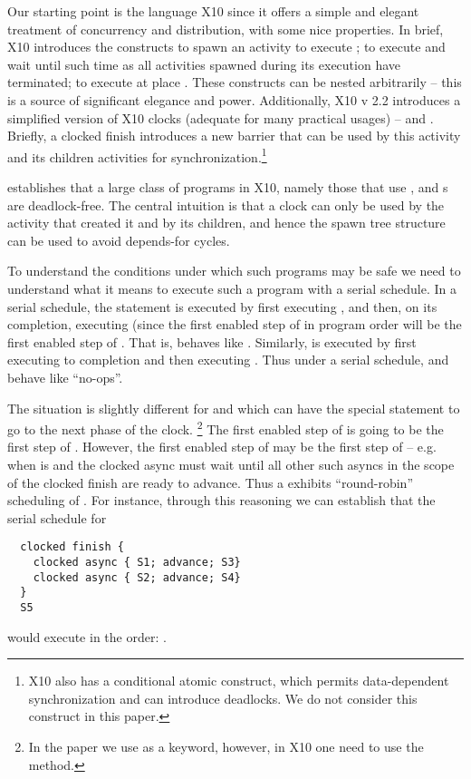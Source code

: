 Our starting point is the language X10 \cite{x10} since it offers a
simple and elegant treatment of concurrency and distribution, with
some nice properties.  In brief, X10
introduces the constructs  to spawn an activity to
execute ;  to execute  and wait until
such time as all activities spawned during its execution have
terminated;  to execute  at place
. These constructs can be nested arbitrarily -- this is a
source of significant elegance and power. Additionally, X10 v 2.2
introduces a simplified version of X10 clocks (adequate for many
practical usages) --  and . Briefly, a clocked finish introduces a new barrier that can be
used by this activity and its children activities for
synchronization.\footnote{X10 also has a conditional atomic construct,
   which permits data-dependent synchronization and
  can introduce deadlocks. We do not consider this construct in this paper.}

\cite{vj-clock} establishes that a large class of programs
in X10, namely those that use ,  and
s are deadlock-free. The central intuition is that a clock
can only be used by the activity that created it and by its children,
and hence the spawn tree structure can be used to avoid depends-for
cycles.

To understand the conditions under which such programs may be safe we
need to understand what it means to execute such a program with a
serial schedule. In a serial schedule, the statement  is executed by first executing , and then, on
its completion, executing  (since the first enabled step of
 in program order will be the first enabled step
of .  That is,  behaves like
. Similarly,  is executed by first
executing  to completion and then executing . Thus
under a serial schedule,  and  behave like
``no-ops''.

The situation is slightly different for  and
 which can have the special  statement to go to the next phase of the clock.%
    \footnote{In the paper we use  as a keyword,
        however, in X10 one need to use the  method.}
The first enabled step of  is going to be the first step of . However, the
first enabled step of  may be the first
step of  -- e.g.{} when  is  and
the clocked async must wait until all other such asyncs in the scope
of the clocked finish are ready to advance. Thus a  exhibits ``round-robin'' scheduling of . For
instance, through this reasoning we can establish that the serial
schedule for
\begin{lstlisting}
  clocked finish {
    clocked async { S1; advance; S3}
    clocked async { S2; advance; S4}
  }
  S5
\end{lstlisting}
would execute in the order: .

